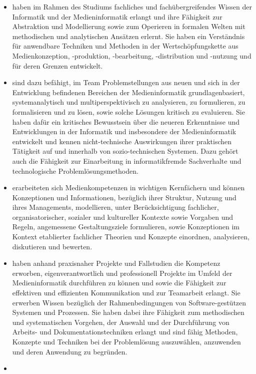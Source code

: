 \begin{itemize}
\item
  haben im Rahmen des Studiums fachliches und fachübergreifendes Wissen
  der Informatik und der Medieninformatik erlangt und ihre Fähigkeit zur
  Abstraktion und Modellierung sowie zum Operieren in formalen Welten
  mit methodischen und analytischen Ansätzen erlernt. Sie haben ein
  Verständnis für anwendbare Techniken und Methoden in der
  Wertschöpfungskette aus Medienkonzeption, -produktion, -bearbeitung,
  -distribution und -nutzung und für deren Grenzen entwickelt.
\item
  sind dazu befähigt, im Team Problemstellungen aus neuen und sich in
  der Entwicklung befindenen Bereichen der Medieninformatik
  grundlagenbasiert, systemanalytisch und multiperspektivisch zu
  analysieren, zu formulieren, zu formalisieren und zu lösen, sowie
  solche Lösungen kritisch zu evaluieren. Sie haben dafür ein kritisches
  Bewusstsein über die neueren Erkenntnisse und Entwicklungen in der
  Informatik und insbesondere der Medieninformatik entwickelt und kennen
  nicht-technische Auswirkungen ihrer praktischen Tätigkeit auf und
  innerhalb von sozio-technischen Systemen. Dazu gehört auch die
  Fähigkeit zur Einarbeitung in informatikfremde Sachverhalte und
  technologische Problemlösungsmethoden.
\item
  erarbeiteten sich Medienkompetenzen in wichtigen Kernfächern und
  können Konzeptionen und Informationen, bezüglich ihrer Struktur,
  Nutzung und ihres Managements, modellieren, unter Berücksichtigung
  fachlicher, organisatorischer, sozialer und kultureller Kontexte sowie
  Vorgaben und Regeln, angemessene Gestaltungsziele formulieren, sowie
  Konzeptionen im Kontext etablierter fachlicher Theorien und Konzepte
  einordnen, analysieren, diskutieren und bewerten.
\item
  haben anhand praxisnaher Projekte und Fallstudien die Kompetenz
  erworben, eigenverantwortlich und professionell Projekte im Umfeld der
  Medieninformatik durchführen zu können und sowie die Fähigkeit zur
  effektiven und effizienten Kommunikation und zur Teamarbeit erlangt.
  Sie erwerben Wissen bezüglich der Rahmenbedingungen von
  Software-gestützen Systemen und Prozessen. Sie haben dabei ihre
  Fähigkeit zum methodischen und systematischen Vorgehen, der Auswahl
  und der Durchführung von Arbeits- und Dokumentationstechniken erlangt
  und sind fähig Methoden, Konzepte und Techniken bei der Problemlösung
  auszuwählen, anzuwenden und deren Anwendung zu begründen.
\item

\end{itemize}
